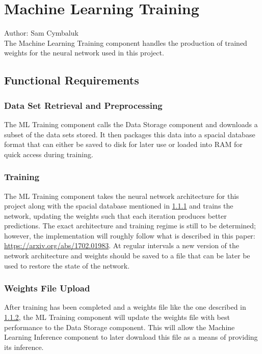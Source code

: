 \documentclass[12pt]{article}
\begin{document}
\section{Machine Learning Training}
Author: Sam Cymbaluk\\

\noindent The Machine Learning Training component handles the production of trained weights for the neural network used in this project.

\subsection{Functional Requirements}

\subsubsection{Data Set Retrieval and Preprocessing} \label{data retrieval}
The ML Training component calls the Data Storage component and downloads a subset of the data sets stored. It then packages this data into a spacial database format that can either be saved to disk for later use or loaded into RAM for quick access during training.

\subsubsection{Training} \label{training}
The ML Training component takes the neural network architecture for this project along with the spacial database mentioned in \ref{data retrieval} and trains the network, updating the weights such that each iteration produces better predictions. The exact architecture and training regime is still to be determined; however, the implementation will roughly follow what is described in this paper: \url{https://arxiv.org/abs/1702.01983}. At regular intervals a new version of the network architecture and weights should be saved to a file that can be later be used to restore the state of the network.

\subsubsection{Weights File Upload}
After training has been completed and a weights file like the one described in \ref{training}, the ML Training component will update the weights file with best performance to the Data Storage component. This will allow the Machine Learning Inference component to later download this file as a means of providing its inference.
\end{document}
